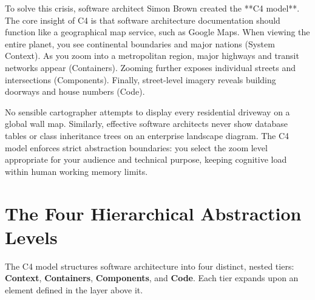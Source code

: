To solve this crisis, software architect Simon Brown created the **C4 model**. The core insight of C4 is that software architecture documentation should function like a geographical map service, such as Google Maps. When viewing the entire planet, you see continental boundaries and major nations (System Context). As you zoom into a metropolitan region, major highways and transit networks appear (Containers). Zooming further exposes individual streets and intersections (Components). Finally, street-level imagery reveals building doorways and house numbers (Code).

\begin{intuitionbox}
No sensible cartographer attempts to display every residential driveway on a global wall map. Similarly, effective software architects never show database tables or class inheritance trees on an enterprise landscape diagram. The C4 model enforces strict abstraction boundaries: you select the zoom level appropriate for your audience and technical purpose, keeping cognitive load within human working memory limits.
\end{intuitionbox}

\section{The Four Hierarchical Abstraction Levels}

The C4 model structures software architecture into four distinct, nested tiers: \textbf{Context}, \textbf{Containers}, \textbf{Components}, and \textbf{Code}. Each tier expands upon an element defined in the layer above it.

